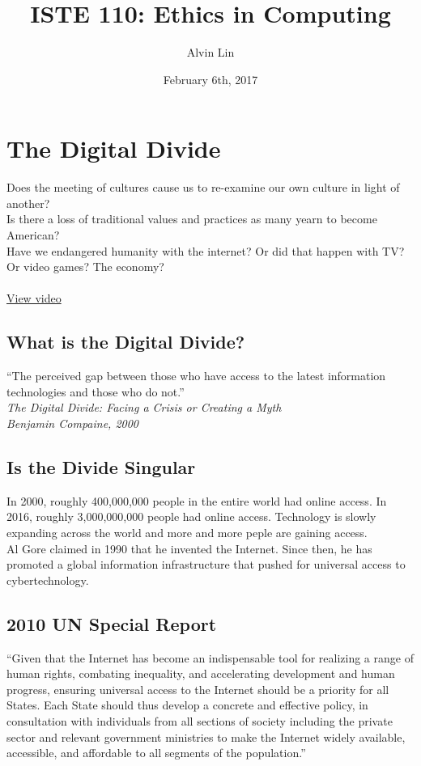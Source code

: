 \documentclass[letterpaper, 12pt]{article}
\title{ISTE 110: Ethics in Computing}
\author{Alvin Lin}
\date{February 6th, 2017}
\begin{document}
\maketitle

\section*{The Digital Divide}
Does the meeting of cultures cause us to re-examine our own culture in light of
another? \\
Is there a loss of traditional values and practices as many yearn to become
American? \\
Have we endangered humanity with the internet? Or did that happen with TV? Or
video games? The economy? \\ \\
\href{http://www.theglobeandmail.com/report-on-business/industry-news/marketing/molsons-newest-red-beer-fridge-touts-canadas-multicultural-side/article25116524/}{View video}

\subsection*{What is the Digital Divide?}
``The perceived gap between those who have access to the latest information
technologies and those who do not.'' \\
\textit{The Digital Divide: Facing a Crisis or Creating a Myth} \\
\textit{Benjamin Compaine, 2000}

\subsection*{Is the Divide Singular}
In 2000, roughly 400,000,000 people in the entire world had online access. In
2016, roughly 3,000,000,000 people had online access. Technology is slowly
expanding across the world and more and more peple are gaining access. \\
Al Gore claimed in 1990 that he invented the Internet. Since then, he has
promoted a global information infrastructure that pushed for universal access to
cybertechnology. \\

\subsection*{2010 UN Special Report}
``Given that the Internet has become an indispensable tool for realizing a
range of human rights, combating inequality, and accelerating development and
human progress, ensuring universal access to the Internet should be a priority
for all States. Each State should thus develop a concrete and effective policy,
in consultation with individuals from all sections of society including the
private sector and relevant government ministries to make the Internet widely
available, accessible, and affordable to all segments of the population.''
\end{document}
